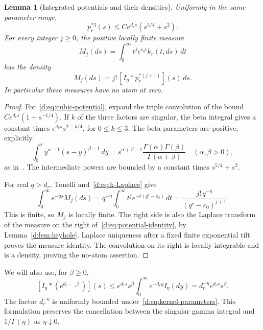 \documentclass[11pt,a4paper]{article}
\numberwithin{equation}{section}
\newtheorem{lemma}[theorem]{Lemma}
\theoremstyle{definition}\newtheorem{definition}[theorem]{Definition}
\theoremstyle{remark}\newtheorem{remark}[theorem]{Remark}
\begin{document}
\begin{lemma}[Integrated potentials and their densities]\label{d:lem:potentials}
Uniformly in the same parameter range,
\begin{equation}\label{d:eq:cubic-potential}
 p_r^{*3}(s)\le C e^{d_rs}(s^{5/4}+s^2).
\end{equation}
For every integer $j\ge0$, the positive locally finite measure
\[
 M_j(ds)=\int_0^\infty t^je^{c_0t}k_r(t,ds)\,dt
\]
has the density
\begin{equation}\label{d:eq:potential-identity}
 M_j(ds)=j!\,[I_\eta*p_r^{*(j+1)}](s)\,ds.
\end{equation}
In particular these measures have no atom at zero.
\end{lemma}
\begin{proof}
For~\eqref{d:eq:cubic-potential}, expand the triple convolution of the bound
$C e^{d_rs}(1+s^{-1/4})$. If $k$ of the three factors are singular, the beta integral gives a constant times $e^{d_rs}s^{2-k/4}$, for $0\le k\le3$. The beta parameters are positive; explicitly
\[
 \int_0^s y^{\alpha-1}(s-y)^{\beta-1}\,dy
 =s^{\alpha+\beta-1}
       \frac{\Gamma(\alpha)\Gamma(\beta)}{\Gamma(\alpha+\beta)}
 \quad(\alpha,\beta>0),
\]
as in~\cite[Eq.~5.12.1]{DLMF}. The intermediate powers are bounded by a constant times $s^{5/4}+s^2$.

For real $q>d_r$, Tonelli and~\eqref{d:eq:k-Laplace} give
\[
 \int_0^\infty e^{-qs}M_j(ds)
 =q^{-\eta}\int_0^\infty t^je^{-t(q^r-c_0)}\,dt
 =\frac{j!\,q^{-\eta}}{(q^r-c_0)^{j+1}}.
\]
This is finite, so $M_j$ is locally finite. The right side is also the Laplace transform of the measure on the right of~\eqref{d:eq:potential-identity}, by Lemma~\ref{d:lem:keyhole}. Laplace uniqueness after a fixed finite exponential tilt proves the measure identity. The convolution on its right is locally integrable and is a density, proving the no-atom assertion.
\end{proof}

We will also use, for $\beta\ge0$,
\begin{equation}\label{d:eq:gamma-convolution-bound}
 [I_\eta*(e^{d_r\,\cdot}\,\cdot^\beta)](s)
 \le e^{d_rs}s^\beta\int_0^\infty e^{-d_ry}I_\eta(dy)
 =d_r^{-\eta}e^{d_rs}s^\beta.
\end{equation}
The factor $d_r^{-\eta}$ is uniformly bounded under~\eqref{d:eq:kernel-parameters}. This formulation preserves the cancellation between the singular gamma integral and $1/\Gamma(\eta)$ as $\eta\downarrow0$.
\end{document}

